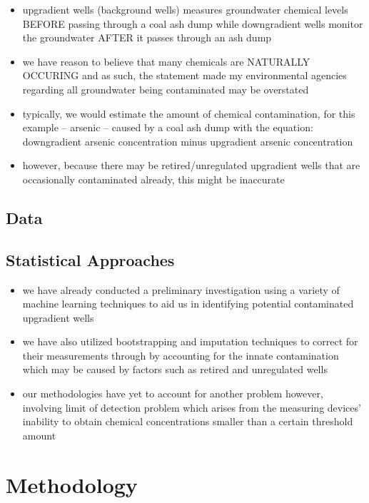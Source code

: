 \documentclass[12pt, twoside]{amherstthesis}
\begin{document}
\begin{itemize}
\item
  upgradient wells (background wells) measures groundwater chemical levels BEFORE passing through a coal ash dump while downgradient wells monitor the groundwater AFTER it passes through an ash dump
\item
  we have reason to believe that many chemicals are NATURALLY OCCURING and as such, the statement made my environmental agencies regarding all groundwater being contaminated may be overstated
\item
  typically, we would estimate the amount of chemical contamination, for this example -- arsenic -- caused by a coal ash dump with the equation: downgradient arsenic concentration minus upgradient arsenic concentration
\item
  however, because there may be retired/unregulated upgradient wells that are occasionally contaminated already, this might be inaccurate
\end{itemize}
\hypertarget{data}{%
\section{Data}\label{data}}

\hypertarget{statistical-approaches}{%
\section{Statistical Approaches}\label{statistical-approaches}}
\begin{itemize}
\item
  we have already conducted a preliminary investigation using a variety of machine learning techniques to aid us in identifying potential contaminated upgradient wells
\item
  we have also utilized bootstrapping and imputation techniques to correct for their measurements through by accounting for the innate contamination which may be caused by factors such as retired and unregulated wells
\item
  our methodologies have yet to account for another problem however, involving limit of detection problem which arises from the measuring devices' inability to obtain chemical concentrations smaller than a certain threshold amount
\end{itemize}
\hypertarget{methodology}{%
\chapter{Methodology}\label{methodology}}
\end{document}
